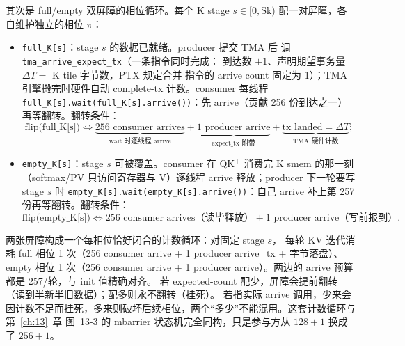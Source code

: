 其次是 full/empty 双屏障的相位循环。每个 K stage $s \in [0,
\mathrm{Sk})$ 配一对屏障，各自维护独立的相位 $\pi$：
\begin{itemize}
  \item \texttt{full\_K[s]}：stage $s$ 的数据已就绪。producer 提交 TMA 后
        调 \texttt{tma\_\allowbreak{}arrive\_\allowbreak{}expect\_\allowbreak{}tx}（一条指令同时完成：
        到达数 $+1$、声明期望事务量 $\Delta T = $ K tile 字节数，PTX 规定合并
        指令的 arrive count 固定为 1）；TMA 引擎搬完时硬件自动 complete-tx
        计数。consumer 每线程
        \texttt{full\_\allowbreak{}K[s].wait\allowbreak{}(full\_\allowbreak{}K[s].arrive\allowbreak{}())}：先 arrive（贡献
        256 份到达之一）再等翻转。翻转条件：
        \begin{equation}
          \text{flip(full\_K[s])} \iff
          \underbrace{256 \text{ consumer arrives}}_{\text{wait 时逐线程 arrive}}
          + \underbrace{1 \text{ producer arrive}}_{\text{expect\_tx 附带}}
          + \underbrace{\text{tx landed} = \Delta T}_{\text{TMA 硬件计数}} ;
          \label{eq:17-flip-full}
        \end{equation}
  \item \texttt{empty\_K[s]}：stage $s$ 可被覆盖。consumer 在 QK$^\top$
        消费完 K smem 的那一刻（softmax/PV 只访问寄存器与 V）逐线程
        arrive 释放；producer 下一轮要写 stage $s$ 时
        \texttt{empty\_\allowbreak{}K[s].wait\allowbreak{}(empty\_\allowbreak{}K[s].arrive\allowbreak{}())}：自己 arrive 补上第
        257 份再等翻转。翻转条件：
        \begin{equation}
          \text{flip(empty\_K[s])} \iff
          256 \text{ consumer arrives（读毕释放）} +
          1 \text{ producer arrive（写前报到）} .
          \label{eq:17-flip-empty}
        \end{equation}
\end{itemize}

两张屏障构成一个每相位恰好闭合的计数循环：对固定 stage $s$，
每轮 KV 迭代消耗 full 相位 1 次（256 consumer arrive $+$ 1 producer
arrive\_tx $+$ 字节落盘）、empty 相位 1 次（256 consumer arrive $+$ 1
producer arrive）。两边的 arrive 预算都是 257/轮，与 init 值精确对齐。
若 expected-count 配少，屏障会提前翻转（读到半新半旧数据）；配多则永不翻转（挂死）。
若指实际 arrive 调用，少来会因计数不足而挂死，多来则破坏后续相位，两个“多少”不能混用。这套计数循环与第~\ref{ch:13}~章
图~13-3 的 mbarrier 状态机完全同构，只是参与方从 $128+1$ 换成了 $256+1$。

